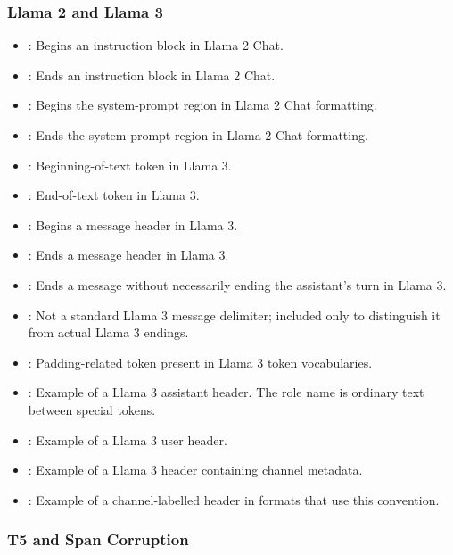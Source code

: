 \subsubsection{Llama 2 and Llama 3}

\begin{itemize}
    \item \tok{[INST]}: Begins an instruction block in Llama 2 Chat.
    \item \tok{[/INST]}: Ends an instruction block in Llama 2 Chat.
    \item {}: Begins the system-prompt region in Llama 2 Chat formatting.
    \item {}: Ends the system-prompt region in Llama 2 Chat formatting.
    \item {}: Beginning-of-text token in Llama 3.
    \item {}: End-of-text token in Llama 3.
    \item {}: Begins a message header in Llama 3.
    \item {}: Ends a message header in Llama 3.
    \item {}: Ends a message without necessarily ending the assistant's turn in Llama 3.
    \item {}: Not a standard Llama 3 message delimiter; included only to distinguish it from actual Llama 3 endings.
    \item {}: Padding-related token present in Llama 3 token vocabularies.
    \item {}: Example of a Llama 3 assistant header. The role name  is ordinary text between special tokens.
    \item {}: Example of a Llama 3 user header.
    \item {}: Example of a Llama 3 header containing channel metadata.
    \item {}: Example of a channel-labelled header in formats that use this convention.
\end{itemize}

\subsubsection{T5 and Span Corruption}

